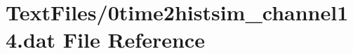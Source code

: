 \hypertarget{0time2histsim__channel14_8dat}{}\section{Text\+Files/0time2histsim\+\_\+channel14.dat File Reference}
\label{0time2histsim__channel14_8dat}
